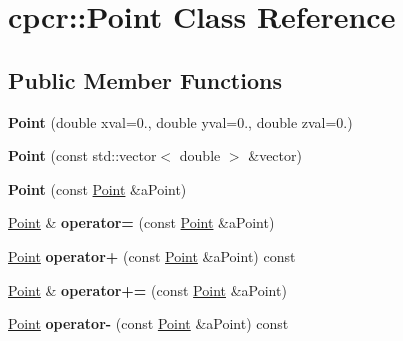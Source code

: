 \hypertarget{classcpcr_1_1Point}{\section{cpcr\-:\-:Point Class Reference}
\label{classcpcr_1_1Point}
}
\subsection*{Public Member Functions}
\begin{DoxyCompactItemize}
\item 
\hypertarget{classcpcr_1_1Point_a52b7c586d60a51e86154ba22c58cba6a}{{\bfseries Point} (double xval=0., double yval=0., double zval=0.)}\label{classcpcr_1_1Point_a52b7c586d60a51e86154ba22c58cba6a}

\item 
\hypertarget{classcpcr_1_1Point_aa702d5dbc45381601af52d2d1abbe745}{{\bfseries Point} (const std\-::vector$<$ double $>$ \&vector)}\label{classcpcr_1_1Point_aa702d5dbc45381601af52d2d1abbe745}

\item 
\hypertarget{classcpcr_1_1Point_aaccd37e406e6ad9d373bc2e81be61d03}{{\bfseries Point} (const \hyperlink{classcpcr_1_1Point}{Point} \&a\-Point)}\label{classcpcr_1_1Point_aaccd37e406e6ad9d373bc2e81be61d03}

\item 
\hypertarget{classcpcr_1_1Point_a8d5c82dfa5a5f9f2baaf2d2ae19a9f91}{\hyperlink{classcpcr_1_1Point}{Point} \& {\bfseries operator=} (const \hyperlink{classcpcr_1_1Point}{Point} \&a\-Point)}\label{classcpcr_1_1Point_a8d5c82dfa5a5f9f2baaf2d2ae19a9f91}

\item 
\hypertarget{classcpcr_1_1Point_ad1ee707b693656f92055194f2955ba92}{\hyperlink{classcpcr_1_1Point}{Point} {\bfseries operator+} (const \hyperlink{classcpcr_1_1Point}{Point} \&a\-Point) const }\label{classcpcr_1_1Point_ad1ee707b693656f92055194f2955ba92}

\item 
\hypertarget{classcpcr_1_1Point_a2bb6373d0366f396f79392fb9885020f}{\hyperlink{classcpcr_1_1Point}{Point} \& {\bfseries operator+=} (const \hyperlink{classcpcr_1_1Point}{Point} \&a\-Point)}\label{classcpcr_1_1Point_a2bb6373d0366f396f79392fb9885020f}

\item 
\hypertarget{classcpcr_1_1Point_a5d65676b0e1eba9049561b5c4d65f0f2}{\hyperlink{classcpcr_1_1Point}{Point} {\bfseries operator-\/} (const \hyperlink{classcpcr_1_1Point}{Point} \&a\-Point) const }\label{classcpcr_1_1Point_a5d65676b0e1eba9049561b5c4d65f0f2}


\end{DoxyCompactItemize}
